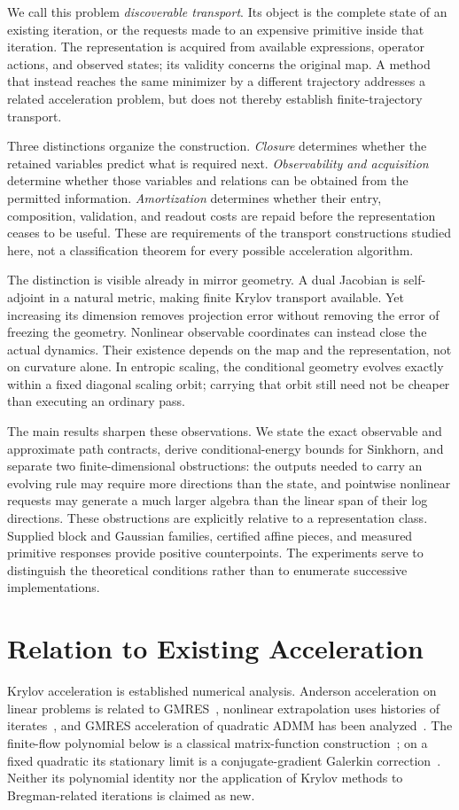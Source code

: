 \documentclass[journal]{IEEEtran}
\theoremstyle{definition}
\begin{document}
We call this problem \emph{discoverable transport}. Its object is the complete
state of an existing iteration, or the requests made to an expensive primitive
inside that iteration. The representation is acquired from available
expressions, operator actions, and observed states; its validity concerns the
original map. A method that instead reaches the same minimizer by a different
trajectory addresses a related acceleration problem, but does not thereby
establish finite-trajectory transport.

Three distinctions organize the construction. \emph{Closure} determines
whether the retained variables predict what is required next.
\emph{Observability and acquisition} determine whether those variables and
relations can be obtained from the permitted information. \emph{Amortization}
determines whether their entry, composition, validation, and readout costs
are repaid before the representation ceases to be useful. These are
requirements of the transport constructions studied here, not a
classification theorem for every possible acceleration algorithm.

The distinction is visible already in mirror geometry. A dual Jacobian is
self-adjoint in a natural metric, making finite Krylov transport available.
Yet increasing its dimension removes projection error without removing the
error of freezing the geometry. Nonlinear observable coordinates can instead
close the actual dynamics. Their existence depends on the map and the
representation, not on curvature alone. In entropic scaling, the conditional
geometry evolves exactly within a fixed diagonal scaling orbit; carrying
that orbit still need not be cheaper than executing an ordinary pass.

The main results sharpen these observations. We state the exact observable
and approximate path contracts, derive conditional-energy bounds for
Sinkhorn, and separate two finite-dimensional obstructions: the outputs
needed to carry an evolving rule may require more directions than the state,
and pointwise nonlinear requests may generate a much larger algebra than
the linear span of their log directions. These obstructions are explicitly
relative to a representation class. Supplied block and Gaussian families,
certified affine pieces, and measured primitive responses provide positive
counterpoints. The experiments serve to distinguish the theoretical
conditions rather than to enumerate successive implementations.

\section{Relation to Existing Acceleration}
Krylov acceleration is established numerical analysis. Anderson acceleration
on linear problems is related to GMRES~\cite{walker}, nonlinear extrapolation
uses histories of iterates~\cite{scieur}, and GMRES acceleration of quadratic
ADMM has been analyzed~\cite{zhang}. The finite-flow polynomial below is a
classical matrix-function construction~\cite{saadexp}; on a fixed quadratic
its stationary limit is a conjugate-gradient Galerkin correction~\cite{saadbook}.
Neither its polynomial identity nor the application of Krylov methods to
Bregman-related iterations is claimed as new.
\end{document}
